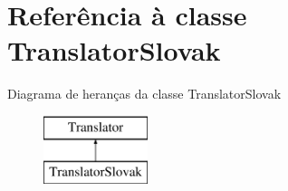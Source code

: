 \hypertarget{class_translator_slovak}{\section{Referência à classe Translator\-Slovak}
\label{class_translator_slovak}
}
Diagrama de heranças da classe Translator\-Slovak\begin{figure}[H]
\begin{center}
\leavevmode
\includegraphics[height=2.000000cm]{class_translator_slovak}
\end{center}
\end{figure}
